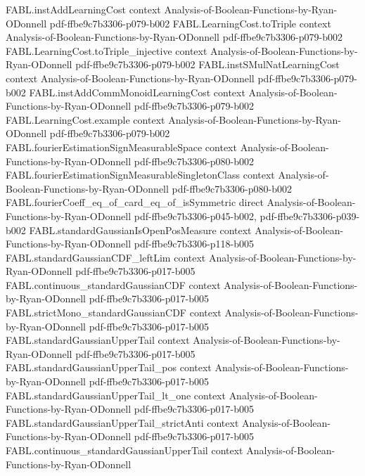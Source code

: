 \begin{theorem}
\proofstep
  {FABL.instAddLearningCost}
  {context}
  {Analysis-of-Boolean-Functions-by-Ryan-ODonnell}
  {pdf-ffbe9c7b3306-p079-b002}
\proofstep
  {FABL.LearningCost.toTriple}
  {context}
  {Analysis-of-Boolean-Functions-by-Ryan-ODonnell}
  {pdf-ffbe9c7b3306-p079-b002}
\proofstep
  {FABL.LearningCost.toTriple_injective}
  {context}
  {Analysis-of-Boolean-Functions-by-Ryan-ODonnell}
  {pdf-ffbe9c7b3306-p079-b002}
\proofstep
  {FABL.instSMulNatLearningCost}
  {context}
  {Analysis-of-Boolean-Functions-by-Ryan-ODonnell}
  {pdf-ffbe9c7b3306-p079-b002}
\proofstep
  {FABL.instAddCommMonoidLearningCost}
  {context}
  {Analysis-of-Boolean-Functions-by-Ryan-ODonnell}
  {pdf-ffbe9c7b3306-p079-b002}
\proofstep
  {FABL.LearningCost.example}
  {context}
  {Analysis-of-Boolean-Functions-by-Ryan-ODonnell}
  {pdf-ffbe9c7b3306-p079-b002}
\proofstep
  {FABL.fourierEstimationSignMeasurableSpace}
  {context}
  {Analysis-of-Boolean-Functions-by-Ryan-ODonnell}
  {pdf-ffbe9c7b3306-p080-b002}
\proofstep
  {FABL.fourierEstimationSignMeasurableSingletonClass}
  {context}
  {Analysis-of-Boolean-Functions-by-Ryan-ODonnell}
  {pdf-ffbe9c7b3306-p080-b002}
\proofstep
  {FABL.fourierCoeff_eq_of_card_eq_of_isSymmetric}
  {direct}
  {Analysis-of-Boolean-Functions-by-Ryan-ODonnell}
  {pdf-ffbe9c7b3306-p045-b002,
    pdf-ffbe9c7b3306-p039-b002}
\proofstep
  {FABL.standardGaussianIsOpenPosMeasure}
  {context}
  {Analysis-of-Boolean-Functions-by-Ryan-ODonnell}
  {pdf-ffbe9c7b3306-p118-b005}
\proofstep
  {FABL.standardGaussianCDF_leftLim}
  {context}
  {Analysis-of-Boolean-Functions-by-Ryan-ODonnell}
  {pdf-ffbe9c7b3306-p017-b005}
\proofstep
  {FABL.continuous_standardGaussianCDF}
  {context}
  {Analysis-of-Boolean-Functions-by-Ryan-ODonnell}
  {pdf-ffbe9c7b3306-p017-b005}
\proofstep
  {FABL.strictMono_standardGaussianCDF}
  {context}
  {Analysis-of-Boolean-Functions-by-Ryan-ODonnell}
  {pdf-ffbe9c7b3306-p017-b005}
\proofstep
  {FABL.standardGaussianUpperTail}
  {context}
  {Analysis-of-Boolean-Functions-by-Ryan-ODonnell}
  {pdf-ffbe9c7b3306-p017-b005}
\proofstep
  {FABL.standardGaussianUpperTail_pos}
  {context}
  {Analysis-of-Boolean-Functions-by-Ryan-ODonnell}
  {pdf-ffbe9c7b3306-p017-b005}
\proofstep
  {FABL.standardGaussianUpperTail_lt_one}
  {context}
  {Analysis-of-Boolean-Functions-by-Ryan-ODonnell}
  {pdf-ffbe9c7b3306-p017-b005}
\proofstep
  {FABL.standardGaussianUpperTail_strictAnti}
  {context}
  {Analysis-of-Boolean-Functions-by-Ryan-ODonnell}
  {pdf-ffbe9c7b3306-p017-b005}
\proofstep
  {FABL.continuous_standardGaussianUpperTail}
  {context}
  {Analysis-of-Boolean-Functions-by-Ryan-ODonnell}

\end{theorem}
